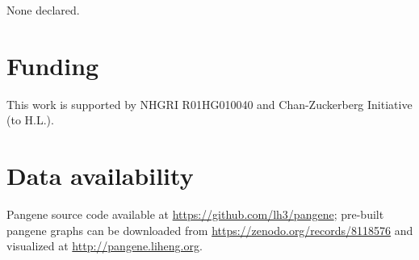 \documentclass[webpdf,contemporary,large,namedate]{oup-authoring-template}%
\begin{document}
None declared.

\section*{Funding}
This work is supported by NHGRI R01HG010040 and Chan-Zuckerberg Initiative (to H.L.).

\section*{Data availability}

Pangene source code available at \href{https://github.com/lh3/pangene}{https://github.com/lh3/pangene};
pre-built pangene graphs can be downloaded from \href{https://zenodo.org/records/8118576}{https://zenodo.org/records/8118576}
and visualized at \href{http://pangene.liheng.org}{http://pangene.liheng.org}.

%


\end{document}
